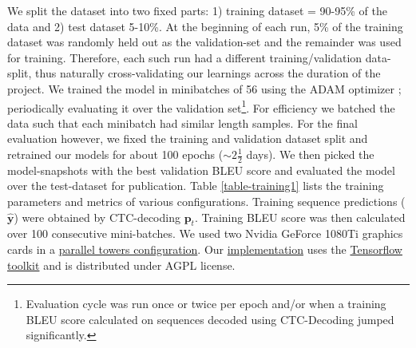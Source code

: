 \documentclass{article}
\newcommand{\implementation}{https://github.com/untrix/im2latex}
\begin{document}
We split the dataset into two fixed parts: 1) training dataset = 90-95\% of the data and 2) test dataset 5-10\%. At the beginning of each run, 5\% of the training dataset was randomly held out as the validation-set and the remainder was used for training. Therefore, each such run had a different training/validation data-split, thus naturally cross-validating our learnings across the duration of the project. We trained the model in minibatches of 56 using the ADAM optimizer \cite{Kingma2014AdamAM}; periodically evaluating it over the validation set\footnote{Evaluation cycle was run once or twice per epoch and/or when a training BLEU score calculated on sequences decoded using CTC-Decoding\cite{Graves2006ConnectionistTC} jumped significantly.}. For efficiency we batched the data such that each minibatch had similar length samples. For the final evaluation however, we fixed the training and validation dataset split and retrained our models for about 100 epochs ($\sim 2\frac{1}{2}$ days). We then picked the model-snapshots with the best validation BLEU score and evaluated the model over the test-dataset for publication. Table \ref{table-training1} lists the training parameters and metrics of various configurations. Training sequence predictions ($\hat{\boldsymbol{y}}$) were obtained by CTC-decoding  \cite{Graves2006ConnectionistTC} $\boldsymbol{p}_t$. Training BLEU score was then calculated over 100 consecutive mini-batches. We used two Nvidia GeForce 1080Ti graphics cards in a \href{https://github.com/petewarden/tensorflow_makefile/blob/master/tensorflow/models/image/cifar10/cifar10_multi_gpu_train.py}{parallel towers configuration}. Our \href{\implementation}{implementation} uses the \href{https://www.tensorflow.org/}{Tensorflow toolkit} and is distributed under AGPL license. 
\end{document}
